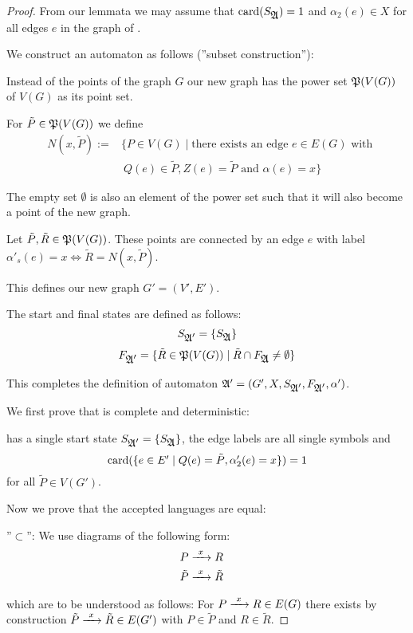 \begin{proof}
From our lemmata we may assume that $\mathrm{card}({S_{\mbox{$\mathfrak{A}$}}}) = 1$ and
$\alpha_2(e) \in X$ for all edges $e$ in the graph of .

We construct an automaton  as follows (''subset construction''):

Instead of the points of the graph $G$ our new graph has the power set
$\mathfrak{P}({V(G)})$ of $V(G)$ as its point set.

For $\tilde{P} \in \mathfrak{P}({V(G)})$ we define 
\begin{eqnarray*}
& N(x, \tilde{P}) := & \{ P \in V(G) \mid \mbox{there exists an edge } e \in
E(G) \mbox{ with } \\
& & \ Q(e) \in \tilde{P}, Z(e) = \tilde{P} \mbox{ and } \alpha(e) = x \} 
\end{eqnarray*}

The empty set $\emptyset$ is also an element of the power set such that it will
also become a point of the new graph.

Let $\tilde{P}, \tilde{R} \in \mathfrak{P}({V(G)})$. These points are connected by an
edge $e$ with label $\alpha'_s(e) = x \Leftrightarrow \tilde{R} = N(x, \tilde{P})$.

This defines our new graph $G' = (V', E')$.

The start and final states are defined as follows:
\[ S_{\mbox{$\mathfrak{A'}$}} = \mbox{$\{S_{\mbox{$\mathfrak{A}$}}\}$} \]
\[ F_{\mbox{$\mathfrak{A'}$}} = \mbox{$\{\tilde{R} \in \mathfrak{P}({V(G)}) \mid \tilde{R} \cap
F_{\mbox{$\mathfrak{A}$}} \neq \emptyset\}$} \]

This completes the definition of automaton $\mbox{$\mathfrak{A'}$} = (G', X,
S_{\mbox{$\mathfrak{A'}$}}, F_{\mbox{$\mathfrak{A'}$}}, \alpha')$.

We first prove that
 is complete and deterministic:

 has a single start state $S_{\mbox{$\mathfrak{A'}$}} = \mbox{$\{S_{\mbox{$\mathfrak{A}$}}\}$}$, 
the edge labels are all single symbols and 
\[ \mathrm{card}({\mbox{$\{e \in E' \mid Q(e) = \tilde{P}, \alpha'_2(e) = x\}$}}) = 1 \]
for all $\tilde{P} \in V(G')$.

Now we prove that the accepted languages are equal:

''$\subset$'': We use diagrams of the following form:
\begin{eqnarray*}
& P \xrightarrow{\ {x}\ } R & \\
& \tilde{P} \xrightarrow{\ {x}\ } \tilde{R} &
\end{eqnarray*}

which are to be understood as follows: For $P \xrightarrow{\ {x}\ } R \in E(G)$
there exists by construction $\tilde{P} \xrightarrow{\ {x}\ } \tilde{R} \in
E(G')$ with $P \in \tilde{P}$ and $R \in \tilde{R}$.


\end{proof}
